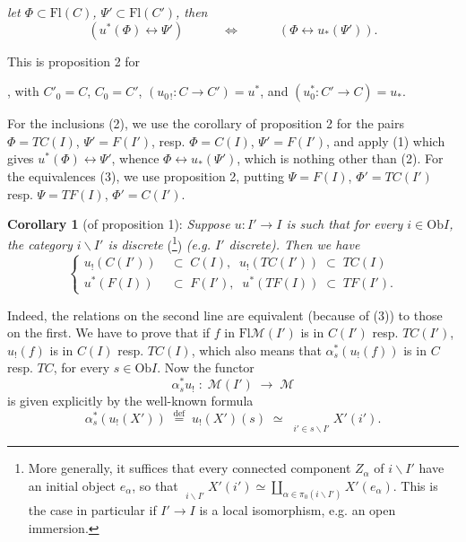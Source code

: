 \documentclass[11pt]{article}
\newcommand{\printedpage}[1]{\marginpar{\footnotesize p.~#1}}
\newcommand{\msp}[1]{\marginpar{\footnotesize [#1]}}
\newcommand{\limind}{\mathop{\underrightarrow{\mathrm{lim}}}}
\newcommand{\M}{\mathcal{M}}
\newcommand{\Fl}{\mathrm{Fl}}
\newcommand{\Ob}{\mathrm{Ob}}
\begin{document}
\printedpage{27}
\noindent\textit{let $\Phi \subset \Fl(C)$, $\Psi' \subset \Fl(C')$, then}
\[
(u^*(\Phi) \longleftrightarrow \Psi') \qquad\quad \iff \qquad\quad (\Phi \longleftrightarrow u_*(\Psi')).
\]

This is proposition 2 for , with $C'_0 = C$, $C_0 = C'$, $(u_{0\,!} : C \longrightarrow C') = u^*$, and $(u_0^* : C' \longrightarrow C) = u_*$.

\noindent\msp{page 47}

For the inclusions (2), we use the corollary of proposition 2 for the pairs $\Phi = TC(I)$, $\Psi' = F(I')$, resp. $\Phi = C(I)$, $\Psi' = F(I')$, and apply (1) which gives $u^*(\Phi) \longleftrightarrow \Psi'$, whence $\Phi \longleftrightarrow u_*(\Psi')$, which is nothing other than (2). For the equivalences (3), we use proposition 2, putting $\Psi = F(I)$, $\Phi' = TC(I')$ resp. $\Psi = TF(I)$, $\Phi' = C(I')$.

\textbf{Corollary 1} (of proposition 1): \textit{Suppose $u : I' \longrightarrow I$ is such that for every $i \in \Ob I$, the category $i\backslash I'$ is discrete} (\footnote[27]{More generally, it suffices that every connected component $Z_\alpha$ of $i\backslash I'$ have an initial object $e_\alpha$, so that $\limind\limits_{i\backslash I'} X'(i') \simeq \coprod_{\alpha\in\pi_0(i\backslash I')} X'(e_\alpha)$. This is the case in particular if $I' \longrightarrow I$ is a local isomorphism, e.g. an open immersion.}) \textit{(e.g. $I'$ discrete). Then we have}
\[
\left\{
\begin{aligned}
u_{!}(C(I')) \;&\subset\; C(I), \;\; u_{!}(TC(I')) \;\subset\; TC(I)\\
u^*(F(I)) \;&\subset\; F(I'), \;\; u^*(TF(I)) \;\subset\; TF(I').
\end{aligned}
\right.
\]

Indeed, the relations on the second line are equivalent (because of (3)) to those on the first. We have to prove that if $f$ in $\Fl\M(I')$ is in $C(I')$ resp. $TC(I')$, $u_{!}(f)$ is in $C(I)$ resp. $TC(I)$, which also means that $\alpha_s^*(u_{!}(f))$ is in $C$ resp. $TC$, for every $s \in \Ob I$. Now the functor
\[
\alpha_s^* u_{!} \;:\; \M(I') \;\longrightarrow\; \M
\]
is given explicitly by the well-known formula
\[
\alpha_s^*(u_{!}(X')) \;\overset{\text{def}}{=}\; u_{!}(X')(s) \;\simeq\; \limind\limits_{i'\in s\backslash I'} X'(i').
\]
\end{document}
